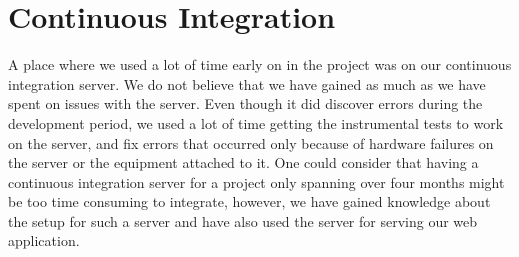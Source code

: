 
\section{Continuous Integration}
A place where we used a lot of time early on in the project was on our continuous integration server. We do not believe that we have gained as much as we have spent on issues with the server. Even though it did discover errors during the development period, we used a lot of time getting the instrumental tests to work on the server, and fix errors that occurred only because of hardware failures on the server or the equipment attached to it. One could consider that having a continuous integration server for a project only spanning over four months might be too time consuming to integrate, however, we have gained knowledge about the setup for such a server and have also used the server for serving our web application. 

